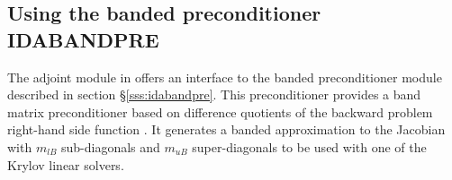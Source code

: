 \subsection{Using the banded preconditioner IDABANDPRE}

The adjoint module in {\idas} offers an interface to the banded 
preconditioner module {\idabandpre} described in section \S\ref{sss:idabandpre}.
This preconditioner provides a band matrix preconditioner based on difference
quotients of the backward problem right-hand side function . It generates
a banded approximation to the Jacobian with $m_{lB}$ sub-diagonals and $m_{uB}$
super-diagonals to be used with one of the Krylov linear solvers.

